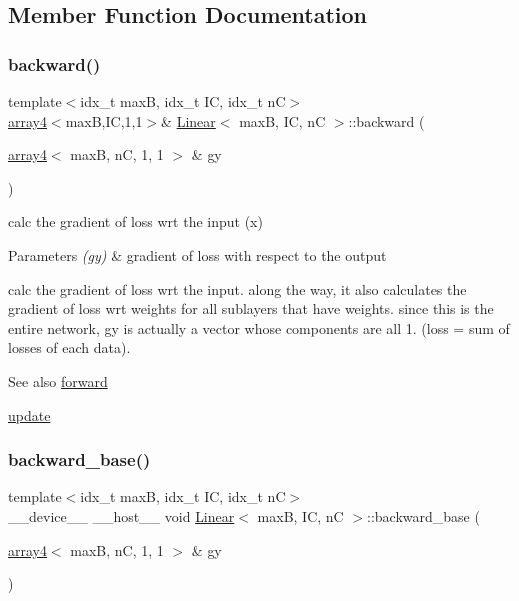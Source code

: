 \subsection{Member Function Documentation}
\mbox{\label{structLinear_aeaa39d38b876fbd70794621955193fd3}} 
\subsubsection{\texorpdfstring{backward()}{backward()}}
{\footnotesize\ttfamily template$<$idx\+\_\+t maxB, idx\+\_\+t IC, idx\+\_\+t nC$>$ \\
\hyperlink{structarray4}{array4}$<$maxB,IC,1,1$>$\& \hyperlink{structLinear}{Linear}$<$ maxB, IC, nC $>$\+::backward (\begin{DoxyParamCaption}\item[{\hyperlink{structarray4}{array4}$<$ maxB, nC, 1, 1 $>$ \&}]{gy }\end{DoxyParamCaption})\hspace{0.3cm}{\ttfamily [inline]}}



calc the gradient of loss wrt the input (x) 


\begin{DoxyParams}{Parameters}
{\em (gy)} & gradient of loss with respect to the output\\
\hline
\end{DoxyParams}
calc the gradient of loss wrt the input. along the way, it also calculates the gradient of loss wrt weights for all sublayers that have weights. since this is the entire network, gy is actually a vector whose components are all 1. (loss = sum of losses of each data). \begin{DoxySeeAlso}{See also}
\hyperlink{structLinear_aed0294f2d1c2013f66d89a52474352e5}{forward} 

\hyperlink{structLinear_a828a72af0a1ccac904325ee280dbefa4}{update} 
\end{DoxySeeAlso}
\mbox{\label{structLinear_adcabfb5486aad2c05dd94bae98acf168}} 
\subsubsection{\texorpdfstring{backward\+\_\+base()}{backward\_base()}}
{\footnotesize\ttfamily template$<$idx\+\_\+t maxB, idx\+\_\+t IC, idx\+\_\+t nC$>$ \\
\+\_\+\+\_\+device\+\_\+\+\_\+ \+\_\+\+\_\+host\+\_\+\+\_\+ void \hyperlink{structLinear}{Linear}$<$ maxB, IC, nC $>$\+::backward\+\_\+base (\begin{DoxyParamCaption}\item[{\hyperlink{structarray4}{array4}$<$ maxB, nC, 1, 1 $>$ \&}]{gy }\end{DoxyParamCaption})\hspace{0.3cm}{\ttfamily [inline]}}



